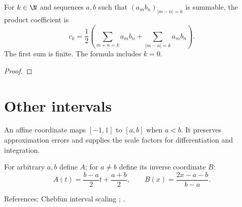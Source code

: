 \begin{supporting}
\begin{theorem}
\label{thm:chebyshev-product-coefficient-formula}
\leanok
For $k\in\N$ and sequences $a,b$ such that $(a_mb_n)_{|m-n|=k}$ is
summable, the product coefficient is
\[
 c_k=\frac12\left(\sum_{m+n=k}a_mb_n+\sum_{|m-n|=k}a_mb_n\right).
\]
The first sum is finite. The formula includes $k=0$.
\end{theorem}
\begin{proof}
\leanok
\end{proof}

\end{supporting}

\section{Other intervals}\label{sec:textbook-calculus-intervals}

An affine coordinate maps $[-1,1]$ to $[a,b]$ when $a<b$. It preserves approximation errors and supplies the scale factors for differentiation and integration.

\begin{definition}
\label{def:affine-chebyshev-interval}
\leanok
For arbitrary $a,b$ define $A$; for $a\ne b$ define its inverse coordinate $B$:
\[
 A(t)=\frac{b-a}{2}t+\frac{a+b}{2},\qquad
 B(x)=\frac{2x-a-b}{b-a}.
\]


References: Chebfun interval scaling \cite{chebfun}; \cite[3.11.12]{dlmf}.
\end{definition}

